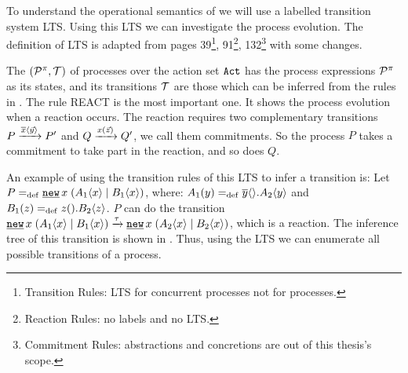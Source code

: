 To understand the operational semantics of \picalc{} we will use  a labelled transition system LTS. Using this LTS we can investigate the \picalc{} process evolution. The definition of LTS is adapted from \cite{milner} pages 39\footnote{Transition Rules: LTS for concurrent processes not for \picalc{} processes.}, 91\footnote{Reaction Rules: no labels and no LTS.}, 132\footnote{Commitment Rules: abstractions and concretions are out of this thesis's scope.} with some changes.

\begin{definition}
\label{def_pi_trans_system}
The  $(\procs,\traces)$ of \picalc{} processes over the action set $\mathtt{Act}$ has the process expressions $\mathcal P^{\pi}$ as its states, and its transitions $\traces$ are those which can be inferred from the rules in .
The rule REACT is the most important one. It shows the process evolution when a reaction occurs. The reaction requires two complementary transitions $P \xrightarrow{\overline{x}\langle\vec{y}\rangle} P'$ and $Q \xrightarrow{x(\vec{z})} Q'$, we call them commitments. So the process $P$ takes a commitment to take part in the reaction, and so does $Q$.

\end{definition}


An example of using the transition rules of this LTS to infer a transition is: Let $P\define\procres{x}{(\procpar{\proccall{A_1}{x}}{\proccall{B_1}{x}})}$, where: $A_1(y)=_{\mathrm{def}}{}\overline{y}\langle{}\rangle.A_2\langle y\rangle$ and $B_1(z)=_{\mathrm{def}}{}z({}).B_2\langle z\rangle$. $P$ can do the transition $\procres{x}{(\procpar{\proccall{A_1}{x}}{\proccall{B_1}{x}})} \transs{\tau} \procres{x}{(\procpar{\proccall{A_2}{x}}{\proccall{B_2}{x}})}$, which is a reaction. The inference tree of this transition is shown in . Thus, using the LTS we can enumerate all possible transitions of a \picalc{} process.



